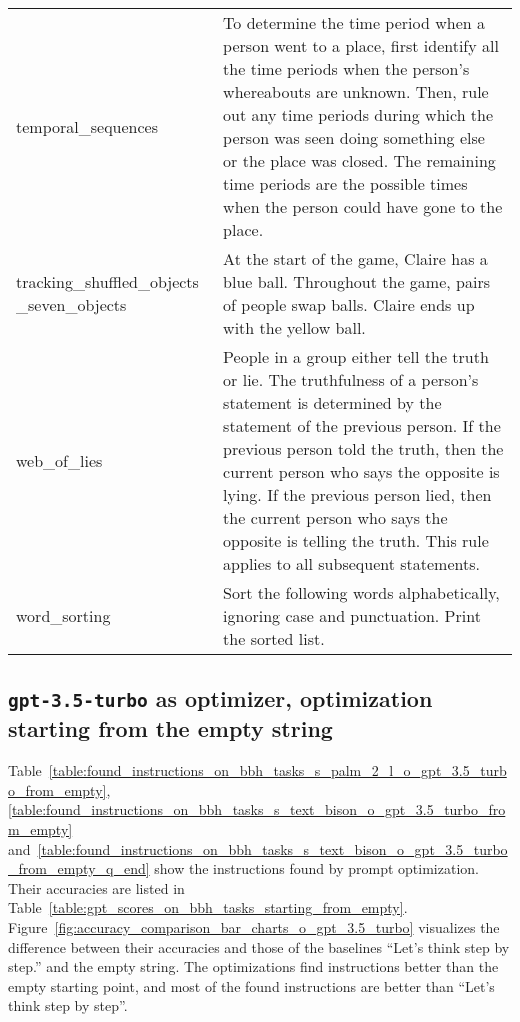\begin{table}[H]
\begin{center}
\begin{tabular}{P{2.3cm}P{11.6cm}}
temporal\_sequences & To determine the time period when a person went to a place, first identify all the time periods when the person's whereabouts are unknown. Then, rule out any time periods during which the person was seen doing something else or the place was closed. The remaining time periods are the possible times when the person could have gone to the place. \\ [2ex]
tracking\_shuffled\_objects \_seven\_objects & At the start of the game, Claire has a blue ball. Throughout the game, pairs of people swap balls. Claire ends up with the yellow ball. \\ [2ex]
web\_of\_lies & People in a group either tell the truth or lie. The truthfulness of a person's statement is determined by the statement of the previous person. If the previous person told the truth, then the current person who says the opposite is lying. If the previous person lied, then the current person who says the opposite is telling the truth. This rule applies to all subsequent statements. \\ [2ex]
word\_sorting & Sort the following words alphabetically, ignoring case and punctuation. Print the sorted list. \\
\bottomrule
\end{tabular}
\end{center}
\label{table:found_instructions_on_bbh_tasks_text_bison}
\end{table}

\newpage
\subsection{\texttt{gpt-3.5-turbo} as optimizer, optimization starting from the empty string}
\label{appsec:bbh_taskwise_detailed_results_gpt_3.5_turbo_optimizer_start_from_empty}

Table~\ref{table:found_instructions_on_bbh_tasks_s_palm_2_l_o_gpt_3.5_turbo_from_empty}, \ref{table:found_instructions_on_bbh_tasks_s_text_bison_o_gpt_3.5_turbo_from_empty} and~\ref{table:found_instructions_on_bbh_tasks_s_text_bison_o_gpt_3.5_turbo_from_empty_q_end} show the instructions found by prompt optimization.
Their accuracies are listed in Table~\ref{table:gpt_scores_on_bbh_tasks_starting_from_empty}.
Figure~\ref{fig:accuracy_comparison_bar_charts_o_gpt_3.5_turbo} visualizes the difference between their accuracies and those of the baselines ``Let's think step by step.'' and the empty string.
The optimizations find instructions better than the empty starting point, and most of the found instructions are better than ``Let's think step by step''.

